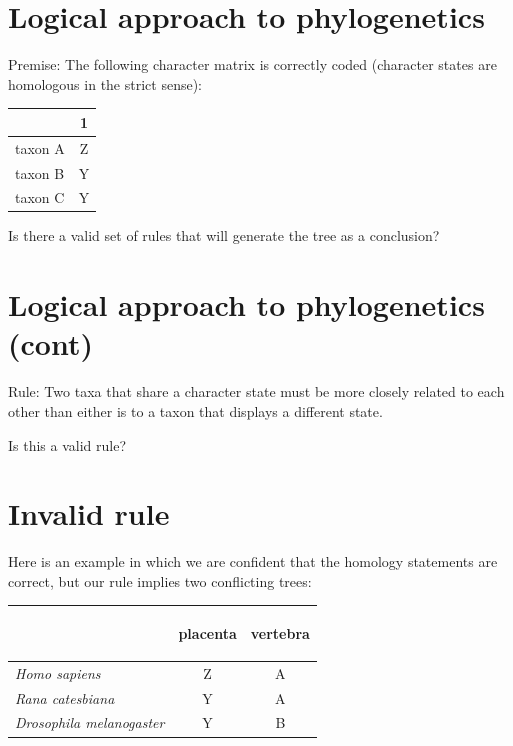 \documentclass[landscape]{foils}
\begin{document}
\myNewSlide
\section*{Logical approach to phylogenetics}
Premise: The following character matrix is correctly coded (character states are 
homologous in the strict sense):\\

\begin{table}[htdp]
\begin{center}
\begin{tabular}{l|c}
 & {1} \\
\hline
{taxon A} & Z\\
{taxon B}  & Y \\
{taxon C}  & Y \\
\end{tabular}
\end{center}
\label{default}
\end{table}

Is there a valid set of rules that will generate the tree
as a conclusion?

\myNewSlide
\section*{Logical approach to phylogenetics (cont)}
Rule: Two taxa that share a character state must be more closely
related to each other than either is to a taxon that displays
a different state.

Is this a valid rule?

\myNewSlide
\section*{Invalid rule}
Here is an example in which we are confident that the homology statements
are correct, but our rule implies two conflicting trees:
\begin{table}[htdp]
\begin{center}
\begin{tabular}{l|c|c}
 & {\begin{sideways}\parbox{15mm}{placenta}\end{sideways}} & {\begin{sideways}\parbox{35mm}{vertebra}\end{sideways}}\\
\hline
{\em Homo sapiens} & Z & A \\
{\em Rana catesbiana}  & Y & A \\
{\em Drosophila melanogaster}  & Y & B \\

\end{tabular}
\end{center}
\label{default}
\end{table}
\end{document}
